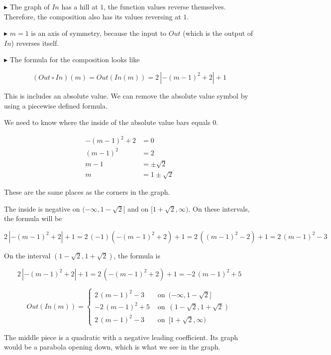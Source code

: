 \documentclass{ximera}
\begin{document}
$\blacktriangleright$ The graph of $In$ has a hill at $1$, the function values reverse themselves.  Therefore, the composition also has its values reversing at $1$.



$\blacktriangleright$ $m=1$ is an axis of symmetry, because the input to $Out$ (which is the output of $In$) reverses itself.




$\blacktriangleright$ The formula for the composition looks like


\[
(Out \circ In)(m) = Out(In(m))  = 2 \, |-(m-1)^2 + 2| + 1
\]

This is includes an absolute value.  We can remove the absolute value symbol by using a piecewise defined formula. 


We need to know where the inside of the absolute value bars equals $0$.


\begin{align*}
-(m-1)^2 + 2   &= 0 \\
(m-1)^2        &= 2 \\
m-1            &= \pm \sqrt{2} \\
m              &= 1 \pm \sqrt{2} 
\end{align*}

These are the same places as the corners in the graph.


The inside is negative on $(-\infty, 1 - \sqrt{2}]$ and on $[1 + \sqrt{2}, \infty)$.  On these intervals, the formula will be 

\[
2 \, |-(m-1)^2 + 2| + 1 = 2 \, (-1)(-(m-1)^2 + 2) + 1 = 2 \, ((m-1)^2 - 2) + 1 = 2 \, (m-1)^2 - 3
\]


On the interval $(1 - \sqrt{2}, 1 + \sqrt{2})$, the formula is 


\[
2 \, |-(m-1)^2 + 2| + 1 = 2 \, (-(m-1)^2 + 2) + 1 =  -2 \, (m-1)^2 + 5
\]







\[
Out(In(m)) = 
\begin{cases}
  2 \, (m-1)^2 -3      &   \text{ on } \, (-\infty, 1 - \sqrt{2}]  \\
  -2 \, (m-1)^2 + 5    &   \text{ on } \, (1 - \sqrt{2}, 1 + \sqrt{2})   \\
  2 \, (m-1)^2 -3      &   \text{ on } \, [1 + \sqrt{2}, \infty)
\end{cases}
\]



The middle piece is a quadratic with a negative leading coefficient.  Its graph would be a parabola opening down, which is what we see in the graph.
\end{document}
